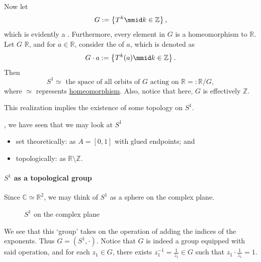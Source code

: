 \documentclass[notoc,notitlepage]{tufte-book}
\begin{document}
Now let
\begin{equation*}
  G := \left\{ T^k \mmid k \in \mathbb{Z} \right\},
\end{equation*}
which is evidently a . Furthermore, every element in $G$ is a
homeomorphism to $\mathbb{R}$. Let $G$  $\mathbb{R}$, and for
$a \in \mathbb{R}$, consider the  of $a$, which is denoted as
\begin{equation*}
  G \cdot a := \left\{ T^k (a) \mmid k \in \mathbb{Z} \right\}.
\end{equation*}
Then
\begin{equation*}
  S^1 \simeq \text{ the space of all orbits of } G \text{ acting on } \mathbb{R} =: \mathbb{R} / G,
\end{equation*}
where $\simeq$ represents \hyperref[defn:homeomorphism]{homeomorphism}.
Also, notice that here, $G$ is effectively $\mathbb{Z}$.

This realization implies the existence of some topology on $S^1$.

, we have seen that we may look at $S^1$
\begin{itemize}
  \item set theoretically: as $A = [0, 1]$ with glued endpoints; and
  \item topologically: as $\mathbb{R} \setminus \mathbb{Z}$.
\end{itemize}

\paragraph{$S^1$ as a topological group}
Since $\mathbb{C} \simeq \mathbb{R}^2$, we may think of $S^1$ as a
sphere on the complex plane.
\begin{figure}[ht]
  \centering
  \caption{$S^1$ on the complex plane}
  \label{fig:_s_1_on_the_complex_plane}
\end{figure}
We see that this `group' takes on the operation of adding the indices
of the exponents. Thus $G = ( S^1, \cdot )$. Notice that $G$ is indeed
a group equipped with said operation, and for each $z_1 \in G$, there
exists $z_1^{-1} = \frac{1}{z_1} \in G$ such that
$z_1 \cdot \frac{1}{z_1} = 1$.
\end{document}
